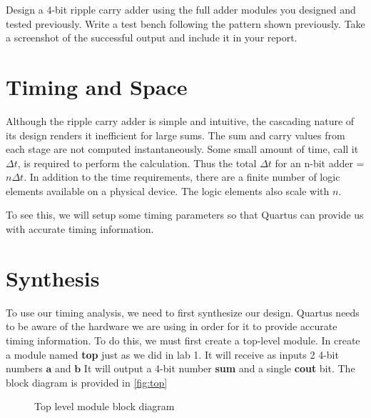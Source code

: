 \documentclass[12pt]{betterjournal}
\begin{document}
\hfill\break
\begin{question}
    Design a 4-bit ripple carry adder using the full adder modules you designed and tested previously. Write a test bench following the pattern shown previously. Take a screenshot of the successful output and include it in your report.
\end{question}
\section{Timing and Space}
Although the ripple carry adder is simple and intuitive, the cascading nature of its design renders it inefficient for large sums. The sum and carry values from each stage are not computed instantaneously. Some small amount of time, call it $\Delta{t}$, is required to perform the calculation. Thus the total $\Delta{t}$ for an n-bit adder = $n\Delta{t}$. In addition to the time requirements, there are a finite number of logic elements available on a physical device. The logic elements also scale with $n$.

To see this, we will setup some timing parameters so that Quartus can provide us with accurate timing information.

\section{Synthesis}
To use our timing analysis, we need to first synthesize our design. Quartus needs to be aware of the hardware we are using in order for it to provide accurate timing information. To do this, we must first create a top-level module. In  create a module named \textbf{top} just as we did in lab 1. It will receive as inputs 2 4-bit numbers $\mathbf{a}$ and $\mathbf{b}$ It will output a 4-bit number \textbf{sum} and a single \textbf{cout} bit. The block diagram is provided in \autoref{fig:top}

\begin{figure}
    \centering
    \caption{Top level module block diagram}
    \label{fig:top}
\end{figure}
\end{document}
